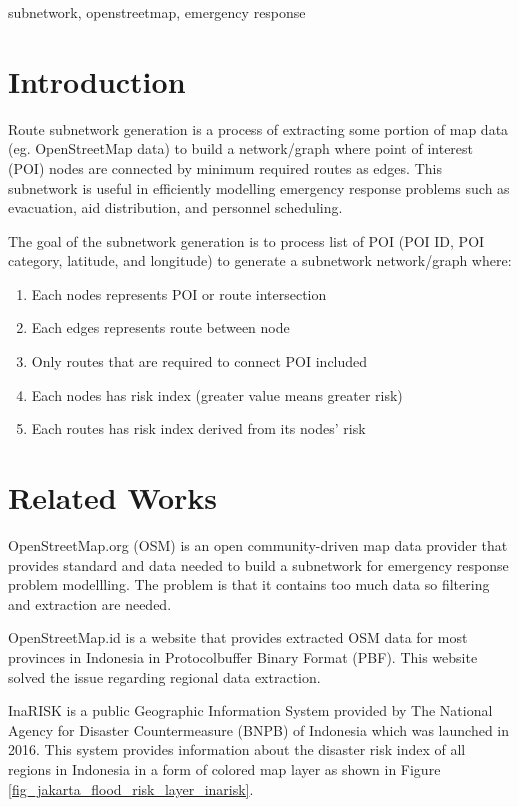 \documentclass[conference]{IEEEtran}
\begin{document}
\begin{IEEEkeywords}
subnetwork, openstreetmap, emergency response
\end{IEEEkeywords}

\section{Introduction}

Route subnetwork generation is a process of extracting some portion of map data (eg. OpenStreetMap data) to build a network/graph where point of interest (POI) nodes are connected by minimum required routes as edges. This subnetwork is useful in efficiently modelling emergency response problems such as evacuation, aid distribution, and personnel scheduling.

The goal of the subnetwork generation is to process list of POI (POI ID, POI category, latitude, and longitude) to generate a subnetwork network/graph where:

\begin{enumerate}
\item Each nodes represents POI or route intersection
\item Each edges represents route between node
\item Only routes that are required to connect POI included
\item Each nodes has risk index (greater value means greater risk)
\item Each routes has risk index derived from its nodes' risk
\end{enumerate} 

\section{Related Works}

OpenStreetMap.org (OSM) \cite{haklay2008openstreetmap} is an open community-driven map data provider that provides standard and data needed to build a subnetwork for emergency response problem modellling. The problem is that it contains too much data so filtering and extraction are needed. 

OpenStreetMap.id is a website that provides extracted OSM data for most provinces in Indonesia in Protocolbuffer Binary Format (PBF). This website solved the issue regarding regional data extraction. 

InaRISK\cite{Bnpb2016Inarisk} is a public Geographic Information System provided by The National Agency for Disaster Countermeasure (BNPB) of Indonesia which was launched in 2016. This system provides information about the disaster risk index of all regions in Indonesia in a form of colored map layer as shown in Figure \ref{fig_jakarta_flood_risk_layer_inarisk}.
\end{document}
